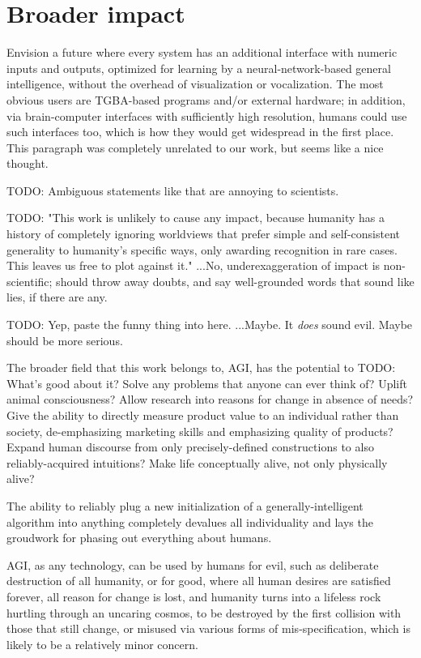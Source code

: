 \documentclass{article}
\begin{document}
\section{Broader impact}

Envision a future where every system has an additional interface with numeric inputs and outputs, optimized for learning by a neural-network-based general intelligence, without the overhead of visualization or vocalization. The most obvious users are TGBA-based programs and/or external hardware; in addition, via brain-computer interfaces with sufficiently high resolution, humans could use such interfaces too, which is how they would get widespread in the first place. This paragraph was completely unrelated to our work, but seems like a nice thought.

    TODO: Ambiguous statements like that are annoying to scientists.

    TODO: "This work is unlikely to cause any impact, because humanity has a history of completely ignoring worldviews that prefer simple and self-consistent generality to humanity's specific ways, only awarding recognition in rare cases. This leaves us free to plot against it." ...No, underexaggeration of impact is non-scientific; should throw away doubts, and say well-grounded words that sound like lies, if there are any.

    TODO: Yep, paste the funny thing into here. ...Maybe. It \textit{does} sound evil. Maybe should be more serious.

The broader field that this work belongs to, AGI, has the potential to TODO: What's good about it? Solve any problems that anyone can ever think of? Uplift animal consciousness? Allow research into reasons for change in absence of needs? Give the ability to directly measure product value to an individual rather than society, de-emphasizing marketing skills and emphasizing quality of products? Expand human discourse from only precisely-defined constructions to also reliably-acquired intuitions? Make life conceptually alive, not only physically alive?

The ability to reliably plug a new initialization of a generally-intelligent algorithm into anything completely devalues all individuality and lays the groudwork for phasing out everything about humans.

AGI, as any technology, can be used by humans for evil, such as deliberate destruction of all humanity, or for good, where all human desires are satisfied forever, all reason for change is lost, and humanity turns into a lifeless rock hurtling through an uncaring cosmos, to be destroyed by the first collision with those that still change, or misused via various forms of mis-specification, which is likely to be a relatively minor concern.

\printbibliography
\end{document}

